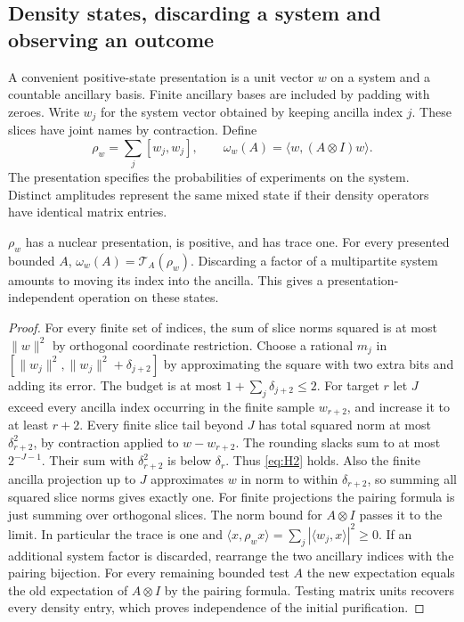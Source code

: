 \subsection{Density states, discarding a system and observing an outcome}

A convenient positive-state presentation is a unit vector $w$ on a
system and a countable ancillary basis. Finite ancillary bases are included
by padding with zeroes. Write $w_j$ for the system vector obtained by
keeping ancilla index $j$. These slices have joint names by contraction.
Define
\[
  \rho_w=\sum_j[w_j,w_j],\qquad
  \omega_w(A)=\langle w,(A\otimes I)w\rangle .
\]
The presentation specifies the probabilities of experiments on the system.
Distinct amplitudes represent the same mixed state if their density
operators have identical matrix entries.

\begin{proposition}
$\rho_w$ has a nuclear presentation, is positive, and has trace one.
For every presented bounded $A$, $\omega_w(A)=\mathcal T_A(\rho_w)$.
Discarding a factor of a multipartite system amounts to moving its
index into the ancilla. This gives a presentation-independent operation
on these states.
\end{proposition}
\begin{proof}
For every finite set of indices, the sum of slice norms squared is at
most $\|w\|^2$ by orthogonal coordinate restriction. Choose a rational
$m_j$ in $[\|w_j\|^2,\|w_j\|^2+\delta_{j+2}]$ by approximating
the square with two extra bits and adding its error. The budget is at
most $1+\sum_j\delta_{j+2}\le 2$. For target $r$ let $J$ exceed
every ancilla index occurring in the finite sample $w_{r+2}$, and
increase it to at least $r+2$. Every finite slice tail beyond $J$
has total squared norm at most $\delta_{r+2}^2$, by contraction
applied to $w-w_{r+2}$. The rounding slacks sum to at most
$2^{-J-1}$. Their sum with $\delta_{r+2}^2$ is below $\delta_r$.
Thus \eqref{eq:H2} holds. Also the finite ancilla projection up to $J$
approximates $w$ in norm to within $\delta_{r+2}$, so summing all
squared slice norms gives exactly one.
For finite projections the pairing formula is just summing over
orthogonal slices. The norm bound for $A\otimes I$ passes it to the
limit. In particular the trace is one and
$\langle x,\rho_w x\rangle=\sum_j|\langle w_j,x\rangle|^2\ge0$.
If an additional system factor is discarded, rearrange the two ancillary
indices with the pairing bijection. For every remaining bounded test $A$
the new expectation equals the old expectation of $A\otimes I$ by
the pairing formula. Testing matrix units recovers every density entry,
which proves independence of the initial purification.
\end{proof}

